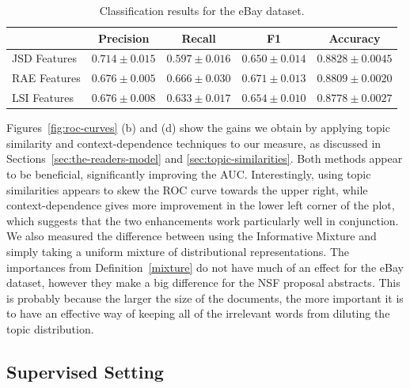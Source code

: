 \begin{table}[t]
\renewcommand{\arraystretch}{1.3}
\caption{Classification results for the eBay dataset.}
\label{tab:classification-results}
\centering
\begin{tabular}{l||c|c|c|c}
&Precision & Recall & F1 & Accuracy
\\ \hline \hline
JSD Features         &$\mathbf{0.714}\pm 0.015$&$0.597\pm 0.016$&$0.650\pm
0.014$& $\mathbf{0.8828}\pm 0.0045$\\
RAE Features         &$0.676\pm 0.005$&$\mathbf{0.666}\pm 0.030$&$\mathbf{0.671}\pm
0.013$&$0.8809\pm 0.0020$ \\
LSI Features             &$0.676\pm 0.008$&$0.633\pm 0.017$&$0.654\pm
0.010$&$0.8778\pm 0.0027$\\
\end{tabular}
\end{table}

Figures~\ref{fig:roc-curves} (b) and (d)  
show the gains we obtain by applying topic
similarity and context-dependence techniques to our measure, as
discussed in Sections~\ref{sec:the-readers-model} and
\ref{sec:topic-similarities}. Both methods appear to be beneficial,
significantly improving the AUC. Interestingly, using
topic similarities appears to skew the ROC curve towards the upper
right, while context-dependence gives more improvement in the lower
left corner of the plot, which suggests that the two enhancements work
particularly well in conjunction. 
We also measured the difference between using 
the Informative Mixture and simply taking a uniform mixture of
distributional representations. The importances from
Definition~\ref{mixture} do not have much of an effect for the eBay
dataset, however they make a big difference
for the NSF proposal abstracts. This is probably because
the larger the size of the documents, the more important it is to
have an effective way of keeping all of the irrelevant words from
diluting the topic distribution. 

\subsection{Supervised Setting}
\label{sec:text-embeddings}

